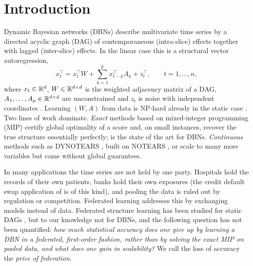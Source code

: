 \section{Introduction}
\label{sec:intro}

Dynamic Bayesian networks (DBNs) describe multivariate time series by a directed acyclic
graph (DAG) of contemporaneous (intra-slice) effects together with lagged (inter-slice)
effects. In the linear case this is a structural vector autoregression,
\begin{equation}
  \label{eq:svar}
  x_t^\top = x_t^\top W + \sum_{k=1}^{p} x_{t-k}^\top A_k + z_t^\top, \qquad t = 1,\dots,n,
\end{equation}
where $x_t\in\mathbb{R}^d$, $W\in\mathbb{R}^{d\times d}$ is the weighted adjacency matrix of a DAG,
$A_1,\dots,A_p\in\mathbb{R}^{d\times d}$ are unconstrained and $z_t$ is noise with independent
coordinates \citep{pamfil2020dynotears}. Learning $(W, A)$ from data is NP-hard already in
the static case \citep{chickering2004large}. Two lines of work dominate. \emph{Exact}
methods based on mixed-integer programming (MIP) certify global optimality of a score and,
on small instances, recover the true structure essentially perfectly; \exdbn{}
\citep{rytir2025exdbn} is the state of the art for DBNs. \emph{Continuous} methods such as
DYNOTEARS \citep{pamfil2020dynotears}, built on NOTEARS \citep{zheng2018notears}, or
\psidag{} \citep{ziu2024psi} scale to many more variables but come without global guarantees.

In many applications the time series are not held by one party. Hospitals hold the records of
their own patients, banks hold their own exposures (the credit default swap application of
\citet{rytir2025exdbn} is of this kind), and pooling the data is ruled out by regulation or
competition. Federated learning \citep{mcmahan2017fedavg,kairouz2021advances} addresses this
by exchanging models instead of data. Federated structure learning has been studied for
static DAGs \citep{ng2022federated,gao2023feddag,li2024fedcdh}, but to our knowledge not for
DBNs, and the following question has not been quantified: \emph{how much statistical accuracy
does one give up by learning a DBN in a federated, first-order fashion, rather than by solving
the exact MIP on pooled data, and what does one gain in scalability?} We call the loss of
accuracy the \emph{price of federation}.

